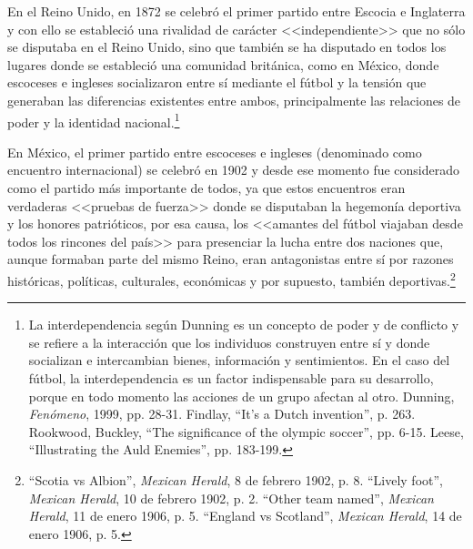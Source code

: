 \documentclass[11pt,a5paper,twoside]{book} %
\begin{document}
En el Reino Unido, en 1872 se celebró el primer partido entre Escocia e Inglaterra y con ello se estableció una rivalidad de carácter <<independiente>> que no sólo se disputaba en el Reino Unido, sino que también se ha disputado en todos los lugares donde se estableció una comunidad británica, como en México, donde escoceses e ingleses socializaron entre sí mediante el fútbol y la tensión que generaban las diferencias existentes entre ambos, principalmente las relaciones de poder y la identidad nacional.\footnote{La interdependencia según Dunning es un concepto de poder y de conflicto y se refiere a la interacción que los individuos construyen entre sí y donde socializan e intercambian bienes, información y sentimientos. En el caso del fútbol, la interdependencia es un factor indispensable para su desarrollo, porque en todo momento las acciones de un grupo afectan al otro. Dunning, \emph{Fenómeno}, 1999, pp. 28-31. Findlay, ``It’s a Dutch invention'', p. 263. Rookwood, Buckley, ``The significance of the olympic soccer'', pp. 6-15. Leese, ``Illustrating the Auld Enemies'', pp. 183-199.}

En México, el primer partido entre escoceses e ingleses (denominado como encuentro
internacional) se celebró en 1902 y desde ese momento fue considerado como el partido más
importante de todos, ya que estos encuentros eran verdaderas <<pruebas de fuerza>> donde se disputaban la hegemonía deportiva y los honores patrióticos, por esa causa, los <<amantes del fútbol viajaban desde todos los rincones del país>> para presenciar la lucha entre dos naciones que, aunque formaban parte del mismo Reino, eran antagonistas entre sí por razones históricas, políticas, culturales, económicas y por supuesto, también deportivas.\footnote{``Scotia vs Albion'', \emph{Mexican Herald}, 8 de febrero 1902, p. 8. ``Lively foot'', \emph{Mexican Herald}, 10 de febrero 1902, p. 2. ``Other team named'', \emph{Mexican Herald}, 11 de enero 1906, p. 5. ``England vs Scotland'', \emph{Mexican Herald}, 14 de enero 1906, p. 5.}
\end{document}

